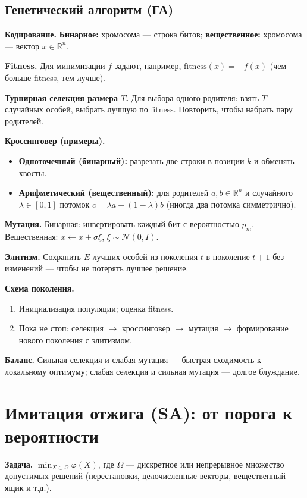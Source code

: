 \documentclass[12pt,a4paper]{article}
\newcommand{\R}{\mathbb{R}}
\begin{document}
\subsection{Генетический алгоритм (ГА)}
\textbf{Кодирование.} \textbf{Бинарное:} хромосома --- строка битов; \textbf{вещественное:} хромосома --- вектор \(x\in\R^n\).

\textbf{Fitness.} Для минимизации \(f\) задают, например, \(\mathrm{fitness}(x)=-f(x)\) (чем больше fitness, тем лучше).

\textbf{Турнирная селекция размера \(T\).} Для выбора одного родителя: взять \(T\) случайных особей, выбрать лучшую по fitness. Повторить, чтобы набрать пару родителей.

\textbf{Кроссинговер (примеры).}
\begin{itemize}
  \item \textbf{Одноточечный (бинарный):} разрезать две строки в позиции \(k\) и обменять хвосты.
  \item \textbf{Арифметический (вещественный):} для родителей \(a,b\in\R^n\) и случайного \(\lambda\in[0,1]\) потомок \(c=\lambda a+(1-\lambda)b\) (иногда два потомка симметрично).
\end{itemize}

\textbf{Мутация.} Бинарная: инвертировать каждый бит с вероятностью \(p_m\). Вещественная: \(x\leftarrow x+\sigma\xi\), \(\xi\sim\mathcal{N}(0,I)\).

\textbf{Элитизм.} Сохранить \(E\) лучших особей из поколения \(t\) в поколение \(t+1\) без изменений --- чтобы не потерять лучшее решение.

\textbf{Схема поколения.}
\begin{enumerate}
  \item Инициализация популяции; оценка fitness.
  \item Пока не стоп: селекция \(\to\) кроссинговер \(\to\) мутация \(\to\) формирование нового поколения с элитизмом.
\end{enumerate}

\textbf{Баланс.} Сильная селекция и слабая мутация --- быстрая сходимость к локальному оптимуму; слабая селекция и сильная мутация --- долгое блуждание.

\section[Имитация отжига]{Имитация отжига (SA): от порога к вероятности}
\textbf{Задача.} \(\min_{X\in\Omega}\varphi(X)\), где \(\Omega\) --- дискретное или непрерывное множество допустимых решений (перестановки, целочисленные векторы, вещественный ящик и т.д.).
\end{document}
